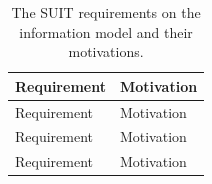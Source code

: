 \documentclass[0-thesis.tex]{subfiles}
\begin{document}
\begin{longtable}[]{@{}ll@{}}
    \caption{The SUIT requirements on the information model and their motivations.}
    \label{tab:information-evaluation}\\
    \toprule
    \begin{minipage}[b]{0.41\columnwidth}\raggedright\strut
    Requirement\strut
    \end{minipage} & \begin{minipage}[b]{0.53\columnwidth}\raggedright\strut
    Motivation\strut
    \end{minipage}\tabularnewline
    \midrule
    \endfirsthead
    \toprule
    \begin{minipage}[b]{0.41\columnwidth}\raggedright\strut
    Requirement\strut
    \end{minipage} & \begin{minipage}[b]{0.53\columnwidth}\raggedright\strut
    Motivation\strut
    \end{minipage}\tabularnewline
    \midrule
    \endhead
    \toprule
    \begin{minipage}[b]{0.41\columnwidth}\raggedright\strut
    Requirement\strut
    \end{minipage} & \begin{minipage}[b]{0.53\columnwidth}\raggedright\strut
    Motivation\strut
    \end{minipage}\tabularnewline
    \midrule
    \endhead
    \toprule
    \begin{minipage}[b]{0.41\columnwidth}\raggedright\strut
    Requirement\strut
    \end{minipage} & \begin{minipage}[b]{0.53\columnwidth}\raggedright\strut
    Motivation\strut
    \end{minipage}\tabularnewline
    \midrule
    \endhead


\end{longtable}
\end{document}
